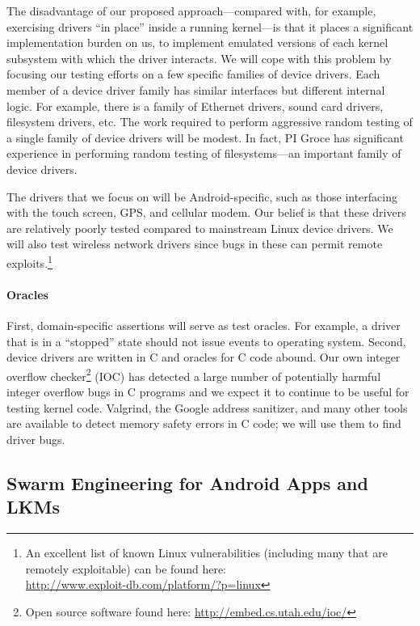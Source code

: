 The disadvantage of our proposed approach---compared with, for
example, exercising drivers ``in place'' inside a running kernel---is
that it places a significant implementation burden on us, to implement
emulated versions of each kernel subsystem with which the driver
interacts.
%
We will cope with this problem by focusing our testing efforts
on a few specific families of device drivers.
%
Each member of a device driver family has similar interfaces but
different internal logic.
%
For example, there is a family of Ethernet drivers, sound card
drivers, filesystem drivers, etc.
%
The work required to perform aggressive random testing of a single
family of device drivers will be modest.
%
In fact, PI Groce has significant experience in performing random
testing of filesystems---an important family of device drivers.


The drivers that we focus on will be Android-specific, such as those
interfacing with the touch screen, GPS, and cellular modem.
%
Our belief is that these drivers are relatively poorly tested
compared to mainstream Linux device drivers.
%
We will also test wireless network drivers since bugs in these can
permit remote exploits.\footnote{An excellent list of known Linux
  vulnerabilities (including many that are remotely exploitable) can
  be found here:\\ \url{http://www.exploit-db.com/platform/?p=linux}}


\paragraph{Oracles}

First, domain-specific assertions will serve as test oracles.
%
For example, a driver that is in a ``stopped'' state should not issue
events to operating system.
%
Second, device drivers are written in C and oracles for C code abound.
%
Our own integer overflow checker\footnote{Open source software found
  here: \url{http://embed.cs.utah.edu/ioc/}} (IOC) has detected a
large number of potentially harmful integer overflow bugs in C
programs and we expect it to continue to be useful for testing kernel
code.
%
Valgrind, the Google address sanitizer, and many other tools
are available to detect memory safety errors in C code; we will
use them to find driver bugs.


\subsection{Swarm Engineering for Android Apps and LKMs}

